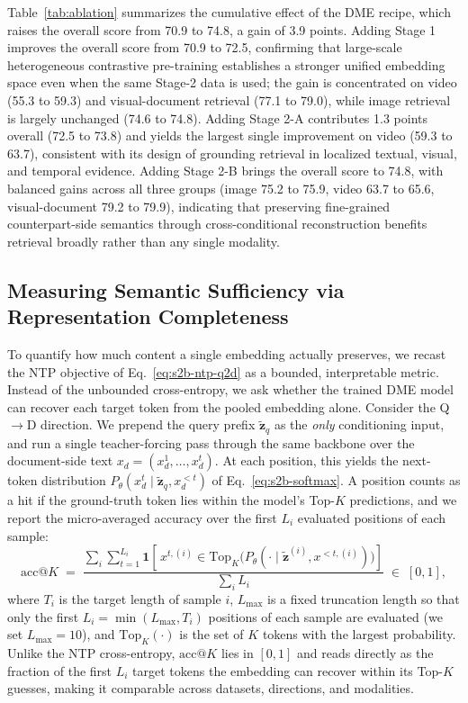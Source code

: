 Table~\ref{tab:ablation} summarizes the cumulative effect of the DME recipe, which raises the overall score from 70.9 to 74.8, a gain of 3.9 points. Adding Stage 1 improves the overall score from 70.9 to 72.5, confirming that large-scale heterogeneous contrastive pre-training establishes a stronger unified embedding space even when the same Stage-2 data is used; the gain is concentrated on video (55.3 to 59.3) and visual-document retrieval (77.1 to 79.0), while image retrieval is largely unchanged (74.6 to 74.8). Adding Stage 2-A contributes 1.3 points overall (72.5 to 73.8) and yields the largest single improvement on video (59.3 to 63.7), consistent with its design of grounding retrieval in localized textual, visual, and temporal evidence. Adding Stage 2-B brings the overall score to 74.8, with balanced gains across all three groups (image 75.2 to 75.9, video 63.7 to 65.6, visual-document 79.2 to 79.9), indicating that preserving fine-grained counterpart-side semantics through cross-conditional reconstruction benefits retrieval broadly rather than any single modality.

\subsection{Measuring Semantic Sufficiency via Representation Completeness}
\label{sec:ntp-topk}
To quantify how much content a single embedding actually preserves, we recast
the NTP objective of Eq.~\eqref{eq:s2b-ntp-q2d} as a bounded, interpretable
metric. Instead of the unbounded cross-entropy, we ask whether the trained DME
model can recover each target token from the pooled embedding alone. Consider
the Q$\rightarrow$D direction. We prepend the query prefix
$\tilde{\mathbf{z}}_q$ as the \emph{only} conditioning input, and run a single
teacher-forcing pass through the same backbone over the document-side 
text $x_d=(x_d^1,\dots,x_d^{t})$. At each position, this yields the         
next-token distribution
$P_\theta\!\left(x_d^{t}\mid \tilde{\mathbf{z}}_q, x_d^{<t}\right)$
of Eq.~\eqref{eq:s2b-softmax}. A position counts as a hit if the ground-truth
token lies within the model's Top-$K$ predictions, and we report the
micro-averaged accuracy over the first $L_i$ evaluated positions of each sample:
\begin{equation}
\mathrm{acc}@K \;=\;
\frac{\displaystyle\sum_{i}\sum_{t=1}^{L_i}
      \mathbf{1}\!\left[\,x^{t,(i)}\in
      \mathrm{Top}_K\!\big(P_\theta(\cdot\mid \tilde{\mathbf{z}}^{(i)}, x^{<t,(i)})\big)\right]}
     {\displaystyle\sum_{i} L_i}\;\in\;[0,1], 
\label{eq:acck}
\end{equation}
where $T_i$ is the target length of sample $i$, $L_{\max}$ is a fixed truncation length so that only the first $L_i=\min(L_{\max}, T_i)$ positions of each sample are evaluated (we set $L_{\max}=10$), and $\mathrm{Top}_K(\cdot)$ is the set of $K$ tokens with the largest probability. Unlike the NTP cross-entropy, $\mathrm{acc}@K$ lies in $[0,1]$ and reads directly as the fraction of the first $L_i$ target tokens the embedding can recover within its Top-$K$ guesses, making it comparable across datasets, directions, and
modalities.

